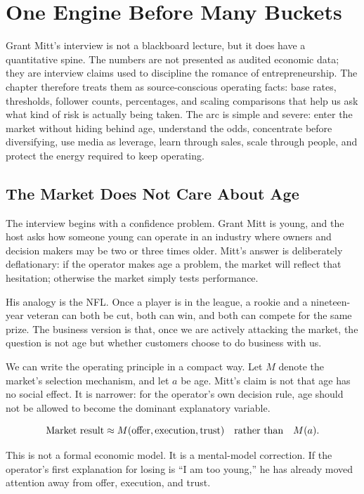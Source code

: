 \chapter{One Engine Before Many Buckets}

Grant Mitt's interview is not a blackboard lecture, but it does have a quantitative spine. The numbers are not presented as audited economic data; they are interview claims used to discipline the romance of entrepreneurship. The chapter therefore treats them as source-conscious operating facts: base rates, thresholds, follower counts, percentages, and scaling comparisons that help us ask what kind of risk is actually being taken. The arc is simple and severe: enter the market without hiding behind age, understand the odds, concentrate before diversifying, use media as leverage, learn through sales, scale through people, and protect the energy required to keep operating.

\section{The Market Does Not Care About Age}

The interview begins with a confidence problem. Grant Mitt is young, and the host asks how someone young can operate in an industry where owners and decision makers may be two or three times older. Mitt's answer is deliberately deflationary: if the operator makes age a problem, the market will reflect that hesitation; otherwise the market simply tests performance.

His analogy is the NFL. Once a player is in the league, a rookie and a nineteen-year veteran can both be cut, both can win, and both can compete for the same prize. The business version is that, once we are actively attacking the market, the question is not age but whether customers choose to do business with us.

We can write the operating principle in a compact way. Let \(M\) denote the market's selection mechanism, and let \(a\) be age. Mitt's claim is not that age has no social effect. It is narrower: for the operator's own decision rule, age should not be allowed to become the dominant explanatory variable.

\begin{equation}
  \hbox{Market result} \approx M(\hbox{offer},\hbox{execution},\hbox{trust})
  \quad \hbox{rather than} \quad
  M(a).
\end{equation}

This is not a formal economic model. It is a mental-model correction. If the operator's first explanation for losing is ``I am too young,'' he has already moved attention away from offer, execution, and trust.

